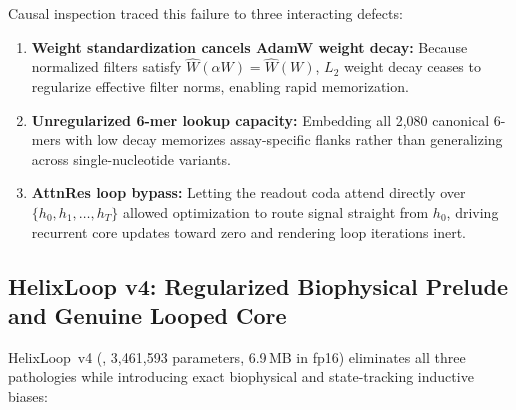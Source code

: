 \documentclass[10.5pt,a4paper]{article}
\begin{document}
Causal inspection traced this failure to three interacting defects:
\begin{enumerate}
\item \textbf{Weight standardization cancels AdamW weight decay:} Because normalized filters satisfy $\hat{W}(\alpha W)=\hat{W}(W)$, $L_2$ weight decay ceases to regularize effective filter norms, enabling rapid memorization.
\item \textbf{Unregularized 6-mer lookup capacity:} Embedding all 2,080 canonical 6-mers with low decay memorizes assay-specific flanks rather than generalizing across single-nucleotide variants.
\item \textbf{AttnRes loop bypass:} Letting the readout coda attend directly over $\{h_0, h_1, \dots, h_T\}$ allowed optimization to route signal straight from $h_0$, driving recurrent core updates toward zero and rendering loop iterations inert.
\end{enumerate}

\subsection{HelixLoop v4: Regularized Biophysical Prelude and Genuine Looped Core}

HelixLoop~v4 (, 3,461,593 parameters, 6.9\,MB in fp16) eliminates all three pathologies while introducing exact biophysical and state-tracking inductive biases:
\end{document}
